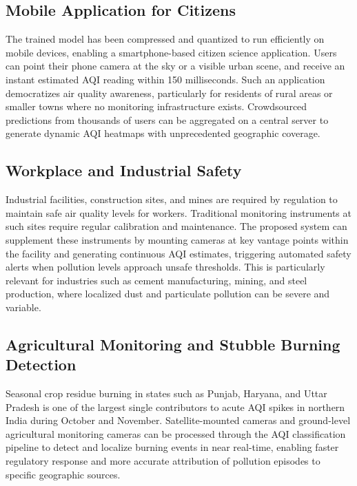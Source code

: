 \documentclass[conference]{IEEEtran}
\begin{document}
\subsection{Mobile Application for Citizens}

The trained model has been compressed and quantized to run efficiently on
mobile devices, enabling a smartphone-based citizen science application.
Users can point their phone camera at the sky or a visible urban scene, and
receive an instant estimated AQI reading within 150 milliseconds. Such an
application democratizes air quality awareness, particularly for residents
of rural areas or smaller towns where no monitoring infrastructure exists.
Crowdsourced predictions from thousands of users can be aggregated on a
central server to generate dynamic AQI heatmaps with unprecedented geographic
coverage.

\subsection{Workplace and Industrial Safety}

Industrial facilities, construction sites, and mines are required by
regulation to maintain safe air quality levels for workers. Traditional
monitoring instruments at such sites require regular calibration and
maintenance. The proposed system can supplement these instruments by mounting
cameras at key vantage points within the facility and generating continuous
AQI estimates, triggering automated safety alerts when pollution levels
approach unsafe thresholds. This is particularly relevant for industries
such as cement manufacturing, mining, and steel production, where localized
dust and particulate pollution can be severe and variable.

\subsection{Agricultural Monitoring and Stubble Burning Detection}

Seasonal crop residue burning in states such as Punjab, Haryana, and Uttar
Pradesh is one of the largest single contributors to acute AQI spikes in
northern India during October and November. Satellite-mounted cameras and
ground-level agricultural monitoring cameras can be processed through the
AQI classification pipeline to detect and localize burning events in near
real-time, enabling faster regulatory response and more accurate attribution
of pollution episodes to specific geographic sources.
\end{document}
